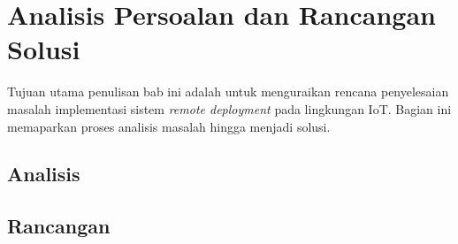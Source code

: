 \chapter{Analisis Persoalan dan Rancangan Solusi}

Tujuan utama penulisan bab ini adalah untuk menguraikan rencana penyelesaian masalah implementasi sistem \textit{remote deployment} pada lingkungan IoT. Bagian ini memaparkan proses analisis masalah hingga menjadi solusi.


\section{Analisis}







\section{Rancangan}






